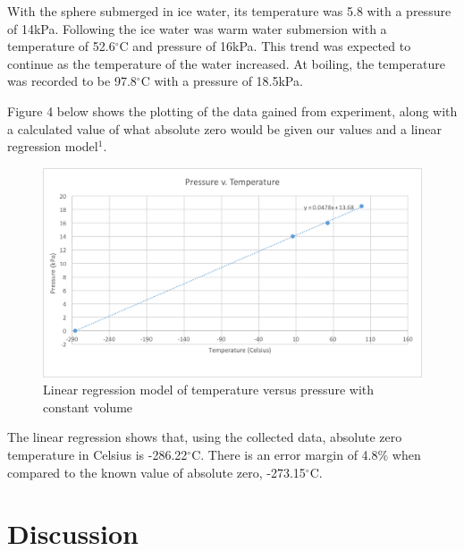 \documentclass[%
 aip,
 jmp,%
 amsmath,amssymb,
 reprint,%
]{revtex4-1}
\begin{document}
  With the sphere submerged in ice water, its temperature was 5.8 with a pressure of 14kPa. Following the ice water was warm water submersion with a temperature of 52.6$^{\circ}$C and pressure of 16kPa. This trend was expected to continue as the temperature of the water increased. At boiling, the temperature was recorded to be 97.8$^{\circ}$C with a pressure of 18.5kPa.

  Figure 4 below shows the plotting of the data gained from experiment, along with a calculated value of what absolute zero would be given our values and a linear regression model$^1$.

  \begin{figure}[h]
    \centering
    \includegraphics[scale=.4]{P_vs_T.png}
    \caption{Linear regression model of temperature versus pressure with constant volume}
    \label{P_vs_T}
  \end{figure}

  The linear regression shows that, using the collected data, absolute zero temperature in Celsius is -286.22$^{\circ}$C. There is an error margin of 4.8$\%$ when compared to the known value of absolute zero, -273.15$^{\circ}$C.

  \section{Discussion}
\end{document}
